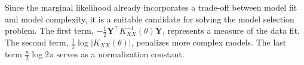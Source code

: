Since the marginal likelihood already incorporates a trade-off between model fit and
model complexity, it is a suitable candidate for solving the model selection problem.
The first term, $- \frac{1}{2} \mathbf{Y}^{\top} K_{XX}^{-1}(\theta) \mathbf{Y}$,
represents a measure of the data fit. The second term, $\frac{1}{2} \log |K_{XX}(\theta)|$,
penalizes more complex models. The last term $\frac{n}{2} \log 2 \pi$ serves as a normalization constant.















